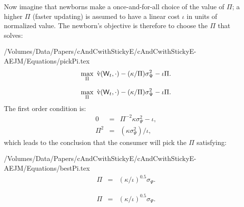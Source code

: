 \documentclass[titlepage]{./econtex}
\begin{document}
Now imagine that newborns make a once-and-for-all choice of the value of $\Pi$; a higher $\Pi$ (faster updating) is assumed to have a linear cost $\iota$ in units of normalized value. The newborn's objective is therefore to choose the $\Pi$ that solves:
\begin{verbatimwrite}{/Volumes/Data/Papers/cAndCwithStickyE/cAndCwithStickyE-AEJM/Equations/pickPi.tex}
\begin{eqnarray*}
   \max_{\Pi} ~ \grave{\mathrm{v}}(\mathsf{W}_t,\cdot)-(\kappa/\Pi)\sigma^{2}_{\Psi}-\iota\Pi. \label{eq:pickPi}
\end{eqnarray*}
\end{verbatimwrite}
\begin{eqnarray*}
   \max_{\Pi} ~ \grave{\mathrm{v}}(\mathsf{W}_t,\cdot)-(\kappa/\Pi)\sigma^{2}_{\Psi}-\iota\Pi. \label{eq:pickPi}
\end{eqnarray*}
 The first order condition is:
\begin{eqnarray*}
     0 & = & \Pi^{-2}\kappa\sigma^{2}_{\Psi}-\iota,
\\  \Pi^{2} & = & (\kappa \sigma^{2}_{\Psi})/\iota,
\end{eqnarray*}
which leads to the conclusion that the consumer will
pick the $\Pi$ satisfying:
\begin{verbatimwrite}{/Volumes/Data/Papers/cAndCwithStickyE/cAndCwithStickyE-AEJM/Equations/bestPi.tex}
\begin{eqnarray*}
  \Pi & = &  (\kappa/\iota)^{0.5} \sigma_{\Psi}. \label{eq:bestPi}
\end{eqnarray*}
\end{verbatimwrite}
\begin{eqnarray*}
  \Pi & = &  (\kappa/\iota)^{0.5} \sigma_{\Psi}. \label{eq:bestPi}
\end{eqnarray*}
 
\end{document}
